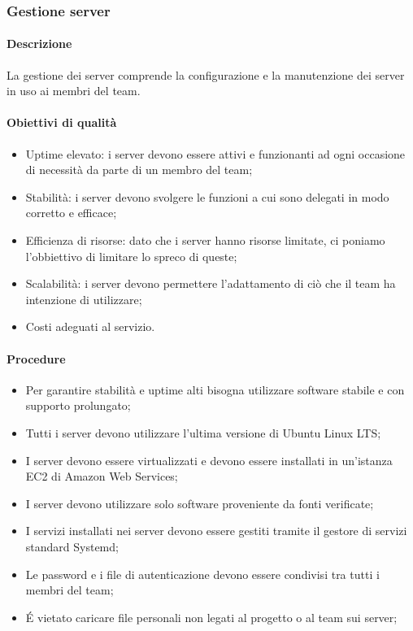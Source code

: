 \documentclass[../NormeDiProgetto_v3.0.0.tex]{subfiles}
\begin{document}
	\subsubsection{Gestione server}
      \paragraph{Descrizione}
        La gestione dei server comprende la configurazione e la manutenzione dei server in uso ai membri del team.
      \paragraph{Obiettivi di qualità}
          \begin{itemize}
            \item Uptime elevato: i server devono essere attivi e funzionanti ad ogni occasione di necessità da parte di un membro del team;
            \item Stabilità: i server devono svolgere le funzioni a cui sono delegati in modo corretto e efficace;
            \item Efficienza di risorse: dato che i server hanno risorse limitate, ci poniamo l'obbiettivo di limitare lo spreco di queste;
            \item Scalabilità: i server devono permettere l'adattamento di ciò che il team ha intenzione di utilizzare;
            \item Costi adeguati al servizio.
          \end{itemize}
      \paragraph{Procedure}
        \begin{itemize}
            \item Per garantire stabilità e uptime alti bisogna utilizzare software stabile e con supporto prolungato;
            \item Tutti i server devono utilizzare l'ultima versione di Ubuntu Linux LTS;
            \item I server devono essere virtualizzati e devono essere installati in un'istanza EC2 di Amazon Web Services;
            \item I server devono utilizzare solo software proveniente da fonti verificate;
            \item I servizi installati nei server devono essere gestiti tramite il gestore di servizi standard Systemd;
            \item Le password e i file di autenticazione devono essere condivisi tra tutti i membri del team;
            \item É vietato caricare file personali non legati al progetto o al team sui server;
        \end{itemize}
		
\end{document}
